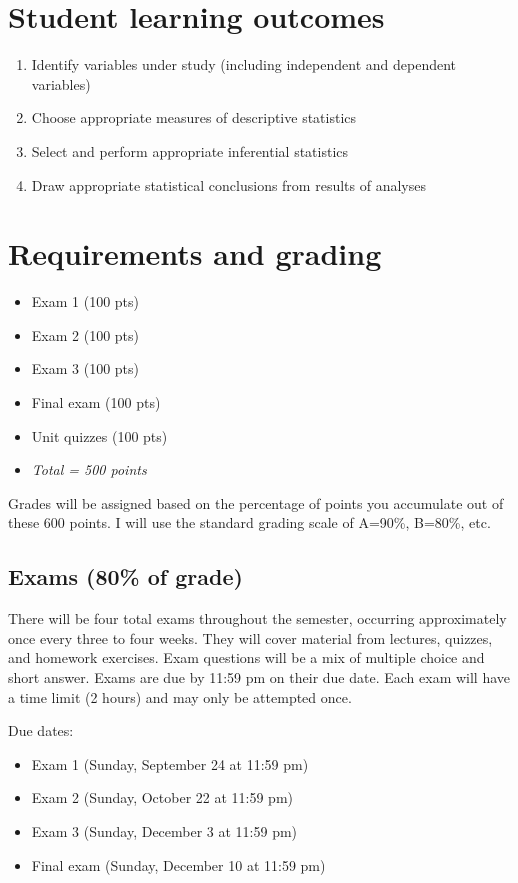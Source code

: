 \documentclass[10pt]{article}
\begin{document}
\section*{Student learning outcomes}
\label{sec-4}
\begin{enumerate}
\item Identify variables under study (including independent and dependent variables)
\item Choose appropriate measures of descriptive statistics
\item Select and perform appropriate inferential statistics
\item Draw appropriate statistical conclusions from results of analyses
\end{enumerate}

\section*{Requirements and grading}
\label{sec-5}
\begin{itemize}
\item Exam 1 (100 pts)
\item Exam 2 (100 pts)
\item Exam 3 (100 pts)
\item Final exam (100 pts)
\item Unit quizzes (100 pts)
\item \emph{Total = 500 points}
\end{itemize}

Grades will be assigned based on the percentage of points you accumulate out of these 600 points.  I will use the standard grading scale of A=90\%, B=80\%, etc.

\subsection*{Exams (80\% of grade)}
\label{sec-5-1}
There will be four total exams throughout the semester, occurring approximately once every three to four weeks.  They will cover material from lectures, quizzes, and homework exercises.  Exam questions will be a mix of multiple choice and short answer.  Exams are due by 11:59 pm on their due date.  Each exam will have a time limit (2 hours) and may only be attempted once.

Due dates:

\begin{itemize}
\item Exam 1 (Sunday, September 24 at 11:59 pm)
\item Exam 2 (Sunday, October 22 at 11:59 pm)
\item Exam 3 (Sunday, December 3 at 11:59 pm)
\item Final exam (Sunday, December 10 at 11:59 pm)
\end{itemize}
\end{document}
